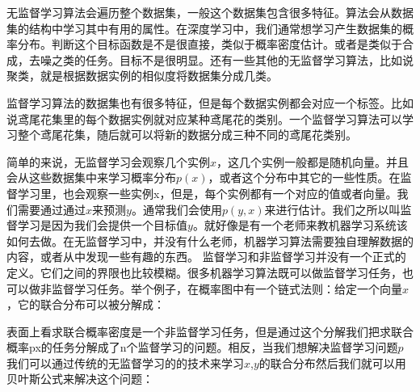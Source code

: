 无监督学习算法会遍历整个数据集，一般这个数据集包含很多特征。算法会从数据集的结构中学习其中有用的属性。在深度学习中，我们通常想学习产生数据集的概率分布。判断这个目标函数是不是很直接，类似于概率密度估计。或者是类似于合成，去噪之类的任务。目标不是很明显。还有一些其他的无监督学习算法，比如说聚类，就是根据数据实例的相似度将数据集分成几类。

监督学习算法的数据集也有很多特征，但是每个数据实例都会对应一个标签。比如说鸢尾花集里的每个数据实例就对应某种鸢尾花的类别。一个监督学习算法可以学习整个鸢尾花集，随后就可以将新的数据分成三种不同的鸢尾花类别。

简单的来说，无监督学习会观察几个实例$x$，这几个实例一般都是随机向量。并且会从这些数据集中来学习概率分布$p(x)$，或者这个分布中其它的一些性质。在监督学习里，也会观察一些实例x，但是，每个实例都有一个对应的值或者向量。我们需要通过通过$x$来预测$y$。通常我们会使用$p(y,x)$来进行估计。我们之所以叫监督学习是因为我们会提供一个目标值$y$。就好像是有一个老师来教机器学习系统该如何去做。在无监督学习中，并没有什么老师，机器学习算法需要独自理解数据的内容，或者从中发现一些有趣的东西。
监督学习和非监督学习并没有一个正式的定义。它们之间的界限也比较模糊。很多机器学习算法既可以做监督学习任务，也可以做非监督学习任务。举个例子，在概率图中有一个链式法则：给定一个向量$x$，它的联合分布可以被分解成：

表面上看求联合概率密度是一个非监督学习任务，但是通过这个分解我们把求联合概率px的任务分解成了n个监督学习的问题。相反，当我们想解决监督学习问题$p$ 我们可以通过传统的无监督学习的的技术来学习$x$,$y$的联合分布然后我们就可以用贝叶斯公式来解决这个问题：
